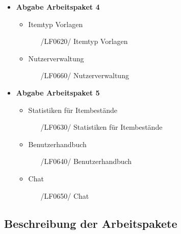 \documentclass[11pt,a4paper]{report}
\begin{document}
\begin{itemize}
\item
  \textbf{Abgabe Arbeitspaket 4}
  \begin{itemize}
    \item
  		Itemtyp Vorlagen
  		\begin{itemize}
  		\leftskip=3em
  		\item[/LF0620/] Itemtyp Vorlagen
  		\end{itemize}
  	\item
  		Nutzerverwaltung
  		\begin{itemize}
  		\leftskip=3em
  		\item[/LF0660/] Nutzerverwaltung
  		\end{itemize}
  \end{itemize}
	

\item
	\textbf{Abgabe Arbeitspaket 5}
	\begin{itemize}
	  \item
  	    Statistiken für Itembestände
  		\begin{itemize}
  		\leftskip=3em
  		\item[/LF0630/] Statistiken für Itembestände
  		\end{itemize}
	\item
  		Benutzerhandbuch
  		\begin{itemize}
  		\leftskip=3em
  		\item[/LF0640/] Benutzerhandbuch
  		\end{itemize}
	\item
  		Chat
  		\begin{itemize}
  		\leftskip=3em
  		\item[/LF0650/] Chat
  		\end{itemize}
	\end{itemize}
	
 \end{itemize}
\newpage

\subsection{Beschreibung der Arbeitspakete}
\end{document}
